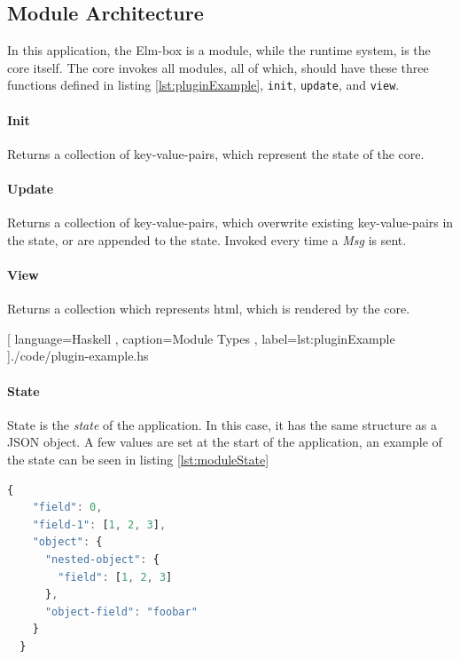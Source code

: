 \subsection{Module Architecture}

In this application, the Elm-box is a module, while the runtime system, is the
core itself. The core invokes all modules, all of which, should have these three
functions defined in listing \ref{lst:pluginExample}, \lstinline{init},
\lstinline{update}, and \lstinline{view}.

\paragraph{Init} Returns a collection of key-value-pairs, which represent
the state of the core.

\paragraph{Update} Returns a collection of key-value-pairs, which
overwrite existing key-value-pairs in the state, or are appended to the state.
Invoked every time a \textit{Msg} is sent.

\paragraph{View} Returns a collection which represents \gls{html},
which is rendered by the core.

\begin{center}
  
    [ language=Haskell
    , caption={Module Types}
    , label=lst:pluginExample
    ]{./code/plugin-example.hs}
\end{center}

\paragraph{State}
State is the \textit{state} of the application. In this case, it has the same
structure as a JSON object. A few values are set at the start of the
application, an example of the state can be seen in listing
\ref{lst:moduleState}

\begin{lstlisting}[language=JavaScript, caption={State Example}, label=lst:moduleState]
  {
    "field": 0,
    "field-1": [1, 2, 3],
    "object": {
      "nested-object": {
        "field": [1, 2, 3]
      },
      "object-field": "foobar"
    }
  }
\end{lstlisting}

